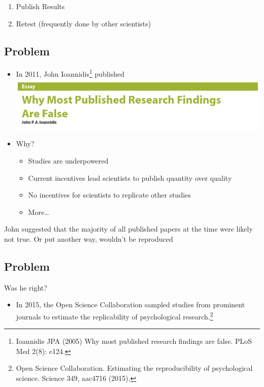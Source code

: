 \documentclass[
  letterpaper,
  DIV=11,
  numbers=noendperiod]{scrartcl}
\providecommand{\tightlist}{%
  \setlength{\itemsep}{0pt}\setlength{\parskip}{0pt}}\usepackage{longtable,booktabs,array}
\begin{document}
\begin{enumerate}
\def\labelenumi{\arabic{enumi}.}
\setcounter{enumi}{6}
\tightlist
\item
  Publish Results
\item
  Retest (frequently done by other scientists)
\end{enumerate}

\subsection{Problem}\label{problem}

\begin{itemize}
\tightlist
\item
  In 2011, John Ioannidis\footnote{Ioannidis JPA (2005) Why most
    published research findings are false. PLoS Med 2(8): e124.}
  published \includegraphics{img/IoannidisPaper.png}
\item
  Why?

  \begin{itemize}
  \tightlist
  \item
    Studies are underpowered
  \item
    Current incentives lead scientists to publish quantity over quality
  \item
    No incentives for scientists to replicate other studies
  \item
    More\ldots{}
  \end{itemize}
\end{itemize}

John suggested that the majority of all published papers at the time
were likely not true. Or put another way, wouldn't be reproduced

\subsection{Problem}\label{problem-1}

Was he right?

\begin{itemize}
\tightlist
\item
  In 2015, the Open Science Collaboration sampled studies from prominent
  journals to estimate the replicability of psychological
  research.\footnote{Open Science Collaboration. Estimating the
    reproducibility of psychological science. Science 349, aac4716
    (2015).}
\end{itemize}
\end{document}
